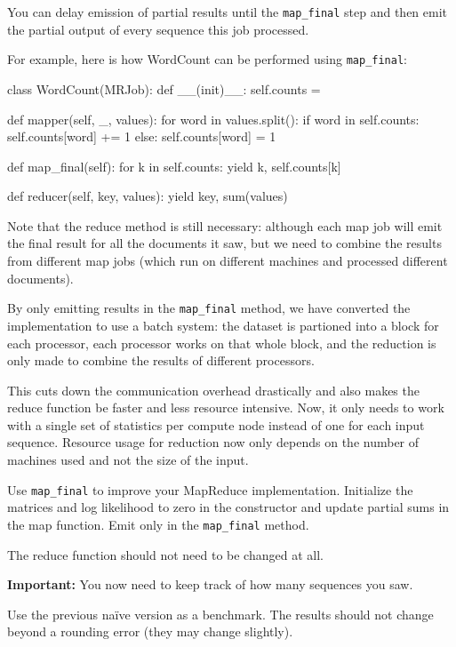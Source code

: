 You can delay emission of partial results until the \verb+map_final+ step and
then emit the partial output of every sequence this job processed.

For example, here is how WordCount can be performed using \verb+map_final+:

\begin{python}
class WordCount(MRJob):
    def __(init)__:
        self.counts = {}
    
    def mapper(self, _, values):
        for word in values.split():
            if word in self.counts:
                self.counts[word] += 1
            else:
                self.counts[word] = 1

    def map_final(self):
        for k in self.counts:
            yield k, self.counts[k]

    def reducer(self, key, values):
        yield key, sum(values)
\end{python}

Note that the reduce method is still necessary: although each map job will emit
the final result for all the documents it saw, but we need to combine the
results from different map jobs (which run on different machines and processed
different documents).

By only emitting results in the \verb+map_final+ method, we have converted the
implementation to use a batch system: the dataset is partioned into a block for
each processor, each processor works on that whole block, and the reduction is
only made to combine the results of different processors.

This cuts down the communication overhead drastically and also makes the reduce
function be faster and less resource intensive. Now, it only needs to work with
a single set of statistics per compute node instead of one for each input
sequence. Resource usage for reduction now only depends on the number of
machines used and not the size of the input.

\begin{exercise}
Use \verb+map_final+ to improve your MapReduce implementation. Initialize the
matrices and log likelihood to zero in the constructor and update partial sums
in the map function. Emit only in the \verb+map_final+ method.

The reduce function should not need to be changed at all.

\textbf{Important:} You now need to keep track of how many sequences you saw. %

Use the previous naïve version as a benchmark. The results should not change
beyond a rounding error (they may change slightly).
\end{exercise}

